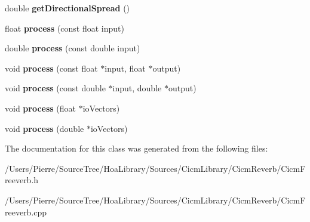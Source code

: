 \begin{DoxyCompactItemize}
\item 
\hypertarget{class_freeverb_ad27902328f01d5e65c5223e2a1ee213e}{double {\bfseries get\-Directional\-Spread} ()}\label{class_freeverb_ad27902328f01d5e65c5223e2a1ee213e}

\item 
\hypertarget{class_freeverb_a68099ba0e24b9fe23ac422f0386fd383}{float {\bfseries process} (const float input)}\label{class_freeverb_a68099ba0e24b9fe23ac422f0386fd383}

\item 
\hypertarget{class_freeverb_a783cdc98fbd009ee9c6202ab5bd33c22}{double {\bfseries process} (const double input)}\label{class_freeverb_a783cdc98fbd009ee9c6202ab5bd33c22}

\item 
\hypertarget{class_freeverb_a00e5b12b6fa9e1bcbc53c10299e20167}{void {\bfseries process} (const float $\ast$input, float $\ast$output)}\label{class_freeverb_a00e5b12b6fa9e1bcbc53c10299e20167}

\item 
\hypertarget{class_freeverb_aab4d0bcd47a931ac38ab298cc978a19d}{void {\bfseries process} (const double $\ast$input, double $\ast$output)}\label{class_freeverb_aab4d0bcd47a931ac38ab298cc978a19d}

\item 
\hypertarget{class_freeverb_aa60cc11f6269eba0a12ccdd70a785148}{void {\bfseries process} (float $\ast$io\-Vectors)}\label{class_freeverb_aa60cc11f6269eba0a12ccdd70a785148}

\item 
\hypertarget{class_freeverb_a4fc0e61874b9bcb437ffcbee83834e8e}{void {\bfseries process} (double $\ast$io\-Vectors)}\label{class_freeverb_a4fc0e61874b9bcb437ffcbee83834e8e}

\end{DoxyCompactItemize}


The documentation for this class was generated from the following files\-:\begin{DoxyCompactItemize}
\item 
/\-Users/\-Pierre/\-Source\-Tree/\-Hoa\-Library/\-Sources/\-Cicm\-Library/\-Cicm\-Reverb/Cicm\-Freeverb.\-h\item 
/\-Users/\-Pierre/\-Source\-Tree/\-Hoa\-Library/\-Sources/\-Cicm\-Library/\-Cicm\-Reverb/Cicm\-Freeverb.\-cpp\end{DoxyCompactItemize}
